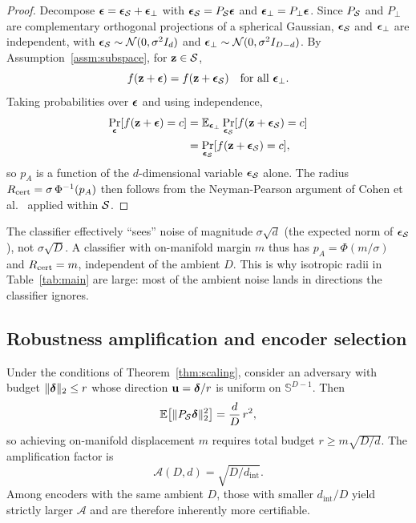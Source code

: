 \begin{proof}
Decompose ${\boldsymbol \epsilon}={\boldsymbol \epsilon}_{\mathcal{S}}+{\boldsymbol \epsilon}_\perp$ with ${\boldsymbol \epsilon}_{\mathcal{S}}=P_{\mathcal{S}}{\boldsymbol \epsilon}$ and ${\boldsymbol \epsilon}_\perp=P_\perp{\boldsymbol \epsilon}$. Since $P_{\mathcal{S}}$ and $P_\perp$ are complementary orthogonal projections of a spherical Gaussian, ${\boldsymbol \epsilon}_{\mathcal{S}}$ and ${\boldsymbol \epsilon}_\perp$ are independent, with ${\boldsymbol \epsilon}_{\mathcal{S}}\sim\mathcal{N}(0,\sigma^2 I_d)$ and ${\boldsymbol \epsilon}_\perp\sim\mathcal{N}(0,\sigma^2 I_{D-d})$. By Assumption~\ref{assm:subspace}, for ${\mathbf z}\in\mathcal{S}$,
\begin{equation}
f({\mathbf z}+{\boldsymbol \epsilon})=f({\mathbf z}+{\boldsymbol \epsilon}_{\mathcal{S}})\quad\text{for all }{\boldsymbol \epsilon}_\perp .
\end{equation}
Taking probabilities over ${\boldsymbol \epsilon}$ and using independence,
\begin{align}
\Pr_{{\boldsymbol \epsilon}}[f({\mathbf z}+{\boldsymbol \epsilon})=c]
&=\mathbb{E}_{{\boldsymbol \epsilon}_\perp}\Pr_{{\boldsymbol \epsilon}_{\mathcal{S}}}[f({\mathbf z}+{\boldsymbol \epsilon}_{\mathcal{S}})=c]\nonumber\\
&=\Pr_{{\boldsymbol \epsilon}_{\mathcal{S}}}[f({\mathbf z}+{\boldsymbol \epsilon}_{\mathcal{S}})=c],
\end{align}
so $p_A$ is a function of the $d$-dimensional variable ${\boldsymbol \epsilon}_{\mathcal{S}}$ alone. The radius $R_{\mathrm{cert}}=\sigma\,\Phi^{-1}(p_A)$ then follows from the Neyman-Pearson argument of Cohen et al.~\cite{cohen2019certified} applied within $\mathcal{S}$.
\end{proof}

\begin{remark}
\label{rem:effnoise}
The classifier effectively ``sees'' noise of magnitude $\sigma\sqrt{d}$ (the expected norm of ${\boldsymbol \epsilon}_{\mathcal{S}}$), not $\sigma\sqrt{D}$. A classifier with on-manifold margin $m$ thus has $p_A=\Phi(m/\sigma)$ and $R_{\mathrm{cert}}=m$, independent of the ambient $D$. This is why isotropic radii in Table~\ref{tab:main} are large: most of the ambient noise lands in directions the classifier ignores.
\end{remark}

\subsection{Robustness amplification and encoder selection}

\begin{corollary}
\label{cor:amp}
Under the conditions of Theorem~\ref{thm:scaling}, consider an adversary with budget $\|{\boldsymbol \delta}\|_2\le r$ whose direction $\mathbf{u}={\boldsymbol \delta}/r$ is uniform on $\mathbb{S}^{D-1}$. Then
\begin{equation}
\mathbb{E}\!\left[\|P_{\mathcal{S}}{\boldsymbol \delta}\|_2^2\right]=\frac{d}{D}\,r^2,
\label{eq:expected}
\end{equation}
so achieving on-manifold displacement $m$ requires total budget $r\ge m\sqrt{D/d}$. The amplification factor is
\begin{equation}
\mathcal{A}(D,d)=\sqrt{D/d_{\mathrm{int}}}.
\label{eq:amp}
\end{equation}
Among encoders with the same ambient $D$, those with smaller $d_{\mathrm{int}}/D$ yield strictly larger $\mathcal{A}$ and are therefore inherently more certifiable.
\end{corollary}


